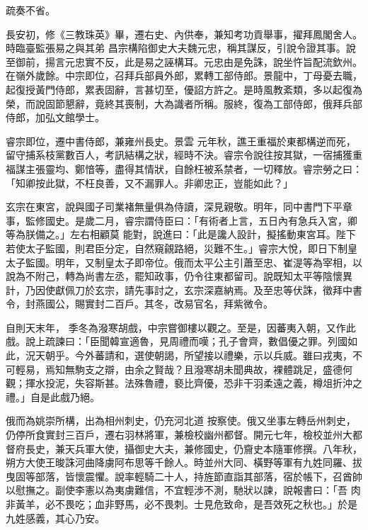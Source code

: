 \begin{pinyinscope}
 疏奏不省。



 長安初，修《三教珠英》畢，遷右史、內供奉，兼知考功貢舉事，擢拜鳳閣舍人。時臨臺監張易之與其弟
 昌宗構陷御史大夫魏元忠，稱其謀反，引說令證其事。說至御前，揚言元忠實不反，此是易之誣構耳。元忠由是免誅，說坐忤旨配流欽州。在嶺外歲餘。中宗即位，召拜兵部員外郎，累轉工部侍郎。景龍中，丁母憂去職，起復授黃門侍郎，累表固辭，言甚切至，優詔方許之。是時風教紊類，多以起復為榮，而說固節懇辭，竟終其喪制，大為識者所稱。服終，復為工部侍郎，俄拜兵部侍郎，加弘文館學士。



 睿宗即位，遷中書侍郎，兼雍州長史。景雲
 元年秋，譙王重福於東都構逆而死，留守捕系枝黨數百人，考訊結構之狀，經時不決。睿宗令說往按其獄，一宿捕獲重福謀主張靈均、鄭愔等，盡得其情狀，自餘枉被系禁者，一切釋放。睿宗勞之曰：「知卿按此獄，不枉良善，又不漏罪人。非卿忠正，豈能如此？」



 玄宗在東宮，說與國子司業褚無量俱為侍讀，深見親敬。明年，同中書門下平章事，監修國史。是歲二月，睿宗謂侍臣曰：「有術者上言，五日內有急兵入宮，卿等為朕備之。」左右相顧莫
 能對，說進曰：「此是讒人設計，擬搖動東宮耳。陛下若使太子監國，則君臣分定，自然窺覦路絕，災難不生。」睿宗大悅，即日下制皇太子監國。明年，又制皇太子即帝位。俄而太平公主引蕭至忠、崔湜等為宰相，以說為不附己，轉為尚書左丞，罷知政事，仍令往東都留司。說既知太平等陰懷異計，乃因使獻佩刀於玄宗，請先事討之，玄宗深嘉納焉。及至忠等伏誅，徵拜中書令，封燕國公，賜實封二百戶。其冬，改易官名，拜紫微令。



 自則天末年，
 季冬為潑寒胡戲，中宗嘗御樓以觀之。至是，因蕃夷入朝，又作此戲。說上疏諫曰：「臣聞韓宣適魯，見周禮而嘆；孔子會齊，數倡優之罪。列國如此，況天朝乎。今外蕃請和，選使朝謁，所望接以禮樂，示以兵威。雖曰戎夷，不可輕易，焉知無駒支之辯，由余之賢哉？且潑寒胡未聞典故，裸體跳足，盛德何觀；揮水投泥，失容斯甚。法殊魯禮，褻比齊優，恐非干羽柔遠之義，樽俎折沖之禮。」自是此戲乃絕。



 俄而為姚崇所構，出為相州刺史，仍充河北道
 按察使。俄又坐事左轉岳州刺史，仍停所食實封三百戶，遷右羽林將軍，兼檢校幽州都督。開元七年，檢校並州大都督府長史，兼天兵軍大使，攝御史大夫，兼修國史，仍齎史本隨軍修撰。八年秋，朔方大使王晙誅河曲降虜阿布思等千餘人。時並州大同、橫野等軍有九姓同羅、拔曳固等部落，皆懷震懼。說率輕騎二十人，持旌節直詣其部落，宿於帳下，召酋帥以慰撫之。副使李憲以為夷虜難信，不宜輕涉不測，馳狀以諫，說報書曰：「吾
 肉非黃羊，必不畏吃；血非野馬，必不畏刺。士見危致命，是吾效死之秋也。」於是九姓感義，其心乃安。




\end{pinyinscope}
